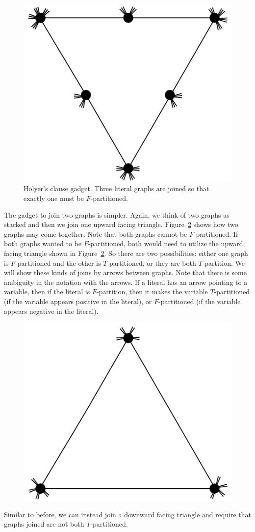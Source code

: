 \documentclass[runningheads,a4paper]{llncs}
\begin{document}
\begin{figure}
\label{fig:join3}
\centering
\includegraphics[width=0.4\linewidth]{Holyer_join_3.pdf}
\caption{Holyer's clause gadget. Three literal graphs are joined so that exactly one must be $F$-partitioned.}
\end{figure} 

The gadget to join two graphs is simpler. Again, we think of two graphs as stacked and then we join one upward facing triangle. Figure~\ref{fig:join2} shows how two graphs may come together. Note that both graphs cannot be $F$-partitioned. If both graphs wanted to be $F$-partitioned, both would need to utilize the upward facing triangle shown in Figure~\ref{fig:join2}. So there are two possibilities: either one graph is $F$-partitioned and the other is $T$-partitioned, or they are both $T$-partition. We will show these kinds of joins by arrows between graphs. Note that there is some ambiguity in the notation with the arrows. If a literal has an arrow pointing to a variable, then if the literal is $F$-partition, then it makes the variable $T$-partitioned (if the variable appears positive in the literal), or $F$-partitioned (if the variable appears negative in the literal).

\begin{figure}
\label{fig:join2}
\centering
\includegraphics[width=0.2\linewidth]{Holyer_join_2.pdf}
\end{figure}

Similar to before, we can instead join a downward facing triangle and require that graphs joined are not both $T$-partitioned. 
\end{document}

